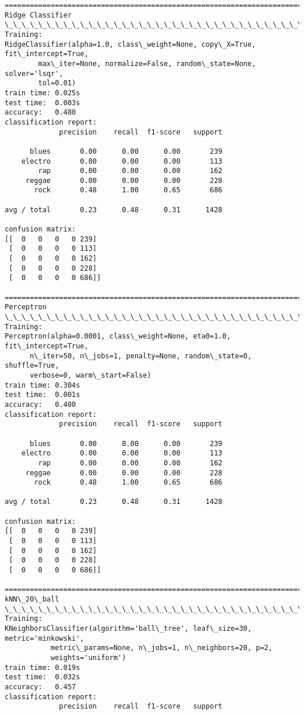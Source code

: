 \documentclass[11pt]{article}
\begin{document}
    \begin{Verbatim}[commandchars=\\\{\}]
================================================================================
Ridge Classifier
\_\_\_\_\_\_\_\_\_\_\_\_\_\_\_\_\_\_\_\_\_\_\_\_\_\_\_\_\_\_\_\_\_\_\_\_\_\_\_\_\_\_\_\_\_\_\_\_\_\_\_\_\_\_\_\_\_\_\_\_\_\_\_\_\_\_\_\_\_\_\_\_\_\_\_\_\_\_\_\_
Training: 
RidgeClassifier(alpha=1.0, class\_weight=None, copy\_X=True, fit\_intercept=True,
        max\_iter=None, normalize=False, random\_state=None, solver='lsqr',
        tol=0.01)
train time: 0.025s
test time:  0.003s
accuracy:   0.480
classification report:
             precision    recall  f1-score   support

      blues       0.00      0.00      0.00       239
    electro       0.00      0.00      0.00       113
        rap       0.00      0.00      0.00       162
     reggae       0.00      0.00      0.00       228
       rock       0.48      1.00      0.65       686

avg / total       0.23      0.48      0.31      1428

confusion matrix:
[[  0   0   0   0 239]
 [  0   0   0   0 113]
 [  0   0   0   0 162]
 [  0   0   0   0 228]
 [  0   0   0   0 686]]

================================================================================
Perceptron
\_\_\_\_\_\_\_\_\_\_\_\_\_\_\_\_\_\_\_\_\_\_\_\_\_\_\_\_\_\_\_\_\_\_\_\_\_\_\_\_\_\_\_\_\_\_\_\_\_\_\_\_\_\_\_\_\_\_\_\_\_\_\_\_\_\_\_\_\_\_\_\_\_\_\_\_\_\_\_\_
Training: 
Perceptron(alpha=0.0001, class\_weight=None, eta0=1.0, fit\_intercept=True,
      n\_iter=50, n\_jobs=1, penalty=None, random\_state=0, shuffle=True,
      verbose=0, warm\_start=False)
train time: 0.304s
test time:  0.001s
accuracy:   0.480
classification report:
             precision    recall  f1-score   support

      blues       0.00      0.00      0.00       239
    electro       0.00      0.00      0.00       113
        rap       0.00      0.00      0.00       162
     reggae       0.00      0.00      0.00       228
       rock       0.48      1.00      0.65       686

avg / total       0.23      0.48      0.31      1428

confusion matrix:
[[  0   0   0   0 239]
 [  0   0   0   0 113]
 [  0   0   0   0 162]
 [  0   0   0   0 228]
 [  0   0   0   0 686]]

================================================================================
kNN\_20\_ball
\_\_\_\_\_\_\_\_\_\_\_\_\_\_\_\_\_\_\_\_\_\_\_\_\_\_\_\_\_\_\_\_\_\_\_\_\_\_\_\_\_\_\_\_\_\_\_\_\_\_\_\_\_\_\_\_\_\_\_\_\_\_\_\_\_\_\_\_\_\_\_\_\_\_\_\_\_\_\_\_
Training: 
KNeighborsClassifier(algorithm='ball\_tree', leaf\_size=30, metric='minkowski',
           metric\_params=None, n\_jobs=1, n\_neighbors=20, p=2,
           weights='uniform')
train time: 0.019s
test time:  0.032s
accuracy:   0.457
classification report:
             precision    recall  f1-score   support


\end{Verbatim}
\end{document}
